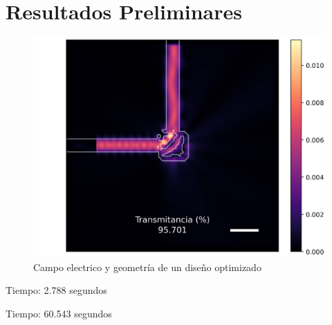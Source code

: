 \chapter{Resultados Preliminares}



\begin{figure}[ht]
  \centering
  \includegraphics[width=\textwidth]{image/results/device.png}
  \caption{Campo electrico y geometría de un diseño optimizado}
  \label{fig:device}
\end{figure}

Tiempo: 2.788 segundos

Tiempo: 60.543 segundos
